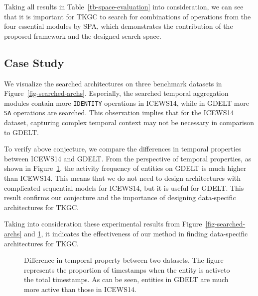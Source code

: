 \documentclass[11pt]{article}
\begin{document}
Taking all results in Table~\ref{tb-space-evaluation} into consideration, 
we can see that it is important for TKGC 
to search for combinations of operations 
from the four essential modules by SPA, 
which demonstrates the contribution of the proposed framework and the designed search space.

\subsection{Case Study}\label{sec:case-study}

We visualize the searched architectures 
on three benchmark datasets in Figure~\ref{fig-searched-archs}.
Especially,
the searched temporal aggregation modules contain more \texttt{IDENTITY} operations in ICEWS14,
while in GDELT more \texttt{SA} operations are searched.
This observation implies that 
for the ICEWS14 dataset, 
capturing complex temporal context may not be necessary 
in comparison to GDELT.

To verify above conjecture, 
we compare the differences in temporal properties between ICEWS14 and GDELT.  
From the perspective of temporal properties, 
as shown in Figure~\ref{fig-data_property}, 
the activity frequency of entities on GDELT is much higher than ICEWS14.
This means that 
we do not need to design architectures 
with complicated sequential models 
for ICEWS14, 
but it is useful for GDELT.
This result confirms our conjecture and the importance of designing data-specific architectures for TKGC.

Taking into consideration these experimental results from Figure~\ref{fig-searched-archs} and \ref{fig-data_property},
it indicates the effectiveness of our method 
in finding data-specific architectures for TKGC. 

\begin{figure}[!h]
	\vspace{-10px}
\caption{Difference in temporal property between two datasets.
		The figure represents the proportion of timestamps when the entity is active\footnotemark to the total timestamps. As can be seen, entities in GDELT are much more active than those in ICEWS14.} 
	\label{fig-data_property}
	\vspace{-10px}
\end{figure}
\end{document}

